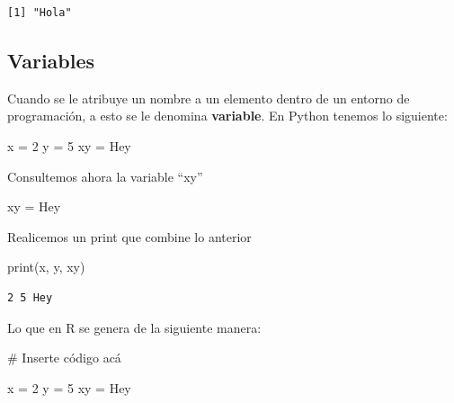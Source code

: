 \documentclass[
  letterpaper,
  DIV=11,
  numbers=noendperiod]{scrartcl}
\newenvironment{Shaded}{\begin{snugshade}}{\end{snugshade}}
\newcommand{\BuiltInTok}[1]{\textcolor[rgb]{0.00,0.23,0.31}{#1}}
\newcommand{\CommentTok}[1]{\textcolor[rgb]{0.37,0.37,0.37}{#1}}
\newcommand{\DecValTok}[1]{\textcolor[rgb]{0.68,0.00,0.00}{#1}}
\newcommand{\NormalTok}[1]{\textcolor[rgb]{0.00,0.23,0.31}{#1}}
\newcommand{\OperatorTok}[1]{\textcolor[rgb]{0.37,0.37,0.37}{#1}}
\newcommand{\OtherTok}[1]{\textcolor[rgb]{0.00,0.23,0.31}{#1}}
\newcommand{\StringTok}[1]{\textcolor[rgb]{0.13,0.47,0.30}{#1}}
\begin{document}
\begin{verbatim}
[1] "Hola"
\end{verbatim}

\subsection{Variables}\label{variables}

Cuando se le atribuye un nombre a un elemento dentro de un entorno de
programación, a esto se le denomina \textbf{variable}. En Python tenemos
lo siguiente:

\begin{Shaded}
\begin{Highlighting}[]
\NormalTok{x }\OperatorTok{=} \DecValTok{2}
\NormalTok{y }\OperatorTok{=} \DecValTok{5}
\NormalTok{xy }\OperatorTok{=} \StringTok{\textquotesingle{}Hey\textquotesingle{}}
\end{Highlighting}
\end{Shaded}

Consultemos ahora la variable ``xy''

\begin{Shaded}
\begin{Highlighting}[]
\NormalTok{xy }\OperatorTok{=} \StringTok{\textquotesingle{}Hey\textquotesingle{}}
\end{Highlighting}
\end{Shaded}

Realicemos un print que combine lo anterior

\begin{Shaded}
\begin{Highlighting}[]
\BuiltInTok{print}\NormalTok{(x, y, xy)}
\end{Highlighting}
\end{Shaded}

\begin{verbatim}
2 5 Hey
\end{verbatim}

Lo que en R se genera de la siguiente manera:

\begin{Shaded}
\begin{Highlighting}[]
\CommentTok{\# Inserte código acá}

\NormalTok{x }\OtherTok{=} \DecValTok{2}
\NormalTok{y }\OtherTok{=} \DecValTok{5}
\NormalTok{xy }\OtherTok{=} \StringTok{\textquotesingle{}Hey\textquotesingle{}}
\end{Highlighting}
\end{Shaded}
\end{document}
